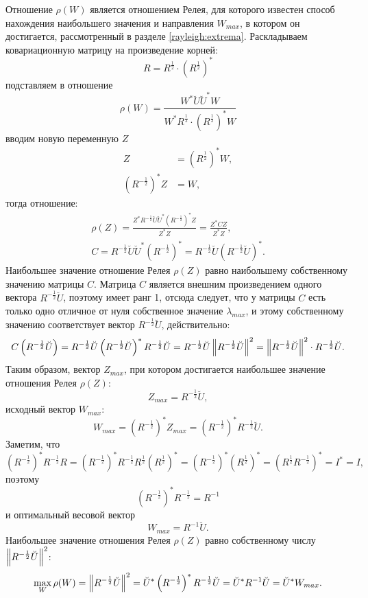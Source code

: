 Отношение $\rho(W)$ является отношением Релея, для которого известен способ нахождения наибольшего значения и направления $W_{max}$, в котором он достигается, рассмотренный
в разделе \ref{rayleigh:extrema}. Раскладываем ковариационную матрицу на произведение корней:
\[
    R = R^\frac{1}{2} \cdot \left( R^\frac{1}{2} \right)^*
\]
подставляем в отношение
\[
    \rho ( W )
    = \frac{W^* \breve{U} \breve{U}^* W}{W^* R^\frac{1}{2} \cdot \left( R^\frac{1}{2} \right)^* W}
\]
вводим новую переменную $Z$
\begin{align*}
    Z & = \left( R^\frac{1}{2} \right)^* W , \\
    \left( R^{-\frac{1}{2}} \right)^* Z & = W ,
\end{align*}
тогда отношение:
\begin{gather*}
    \rho(Z)
    = \frac{Z^* R^{-\frac{1}{2}} \breve{U} \breve{U}^* \left( R^{-\frac{1}{2}} \right)^* Z}{Z^* Z}
    = \frac{Z^* C Z}{Z^* Z}, \\
    C
    = R^{-\frac{1}{2}} \breve{U} \breve{U}^* \left( R^{-\frac{1}{2}} \right)^*
    = R^{-\frac{1}{2}} \breve{U} \left( R^{-\frac{1}{2}} \breve{U} \right)^*.
\end{gather*}
Наибольшее значение отношение Релея $\rho(Z)$ равно наибольшему собственному значению матрицы $C$. Матрица $C$ является внешним произведением одного вектора $R^{-\frac{1}{2}} \breve{U}$,
поэтому имеет ранг 1, отсюда следует, что у матрицы $C$ есть только одно отличное от нуля собственное значение $\lambda_{max}$, и этому собственному значению соответствует вектор
$R^{-\frac{1}{2}} \breve{U}$, действительно:
\[
    C \left( R^{-\frac{1}{2}} \breve{U} \right)
    = R^{-\frac{1}{2}} \breve{U} \left( R^{-\frac{1}{2}} \breve{U} \right)^* R^{-\frac{1}{2}} \breve{U}
    = R^{-\frac{1}{2}} \breve{U} \left \| R^{-\frac{1}{2}} \breve{U} \right \|^2
    = \left \| R^{-\frac{1}{2}} \breve{U} \right \|^2 \cdot R^{-\frac{1}{2}} \breve{U} .
\]
Таким образом, вектор $Z_{max}$, при котором достигается наибольшее значение отношения Релея $\rho(Z)$:
\[
    Z_{max} = R^{-\frac{1}{2}} \breve{U} ,
\]
исходный вектор $W_{max}$:
\[
    W_{max}
    = \left( R^{-\frac{1}{2}} \right)^* Z_{max}
    = \left( R^{-\frac{1}{2}} \right)^* R^{-\frac{1}{2}} \breve{U} .
\]
Заметим, что
\[
    \left( R^{-\frac{1}{2}} \right)^* R^{-\frac{1}{2}} R
    = \left( R^{-\frac{1}{2}} \right)^* R^{-\frac{1}{2}} R^\frac{1}{2} \left( R^\frac{1}{2} \right)^*
    = \left( R^{-\frac{1}{2}} \right)^* \left( R^\frac{1}{2} \right)^*
    = \left( R^\frac{1}{2} R^{-\frac{1}{2}} \right)^*
    = I^*
    = I ,
\]
поэтому
\[
    \left( R^{-\frac{1}{2}} \right)^* R^{-\frac{1}{2}}
    = R^{-1}
\]
и оптимальный весовой вектор
\[
    W_{max}
    = R^{-1} \breve{U} .
\]
Наибольшее значение отношения Релея $\rho(Z)$ равно собственному числу $\left \| R^{-\frac{1}{2}} \breve{U} \right \|^2$:
\[
    \max \limits_W \rho(W)
    = \left \| R^{-\frac{1}{2}} \breve{U} \right \|^2
    = \breve{U}^* \left( R^{-\frac{1}{2}} \right)^* R^{-\frac{1}{2}} \breve{U}
    = \breve{U}^* R^{-1} \breve{U}
    = \breve{U}^* W_{max} .
\]

